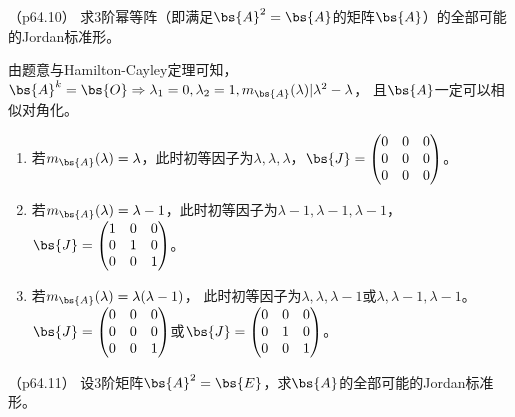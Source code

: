 \documentclass[12pt, a4paper, oneside, UTF8]{ctexbook}
\begin{document}
\begin{question}（p64.10）
    求$3$阶幂等阵（即满足$\bs{A}^2=\bs{A}$的矩阵$\bs{A}$）的全部可能的Jordan标准形。
\end{question}

\begin{solution}
    由题意与Hamilton-Cayley定理可知，$\bs{A}^k=\bs{O} \Rightarrow \lambda_1=0,\lambda_2=1,m_{\bs{A}}(\lambda)|\lambda^2-\lambda$，
    且$\bs{A}$一定可以相似对角化。
    \begin{enumerate}[label=(\arabic*)]
        \item 若$m_{\bs{A}}(\lambda)=\lambda$，此时初等因子为$\lambda,\lambda,\lambda$，$\bs{J}=\begin{pmatrix}
            0 &0 &0\\
            0 &0 &0\\
            0 &0 &0
        \end{pmatrix}$。
        \item 若$m_{\bs{A}}(\lambda)=\lambda-1$，此时初等因子为$\lambda-1,\lambda-1,\lambda-1$，$\bs{J}=\begin{pmatrix}
            1 &0 &0\\
            0 &1 &0\\
            0 &0 &1
        \end{pmatrix}$。
        \item 若$m_{\bs{A}}(\lambda)=\lambda(\lambda-1)$，
        此时初等因子为$\lambda,\lambda,\lambda-1$或$\lambda,\lambda-1,\lambda-1$。$\bs{J}=\begin{pmatrix}
        0 &0 &0\\
        0 &0 &0\\
        0 &0 &1
    \end{pmatrix}$或$\bs{J}=\begin{pmatrix}
        0 &0 &0\\
        0 &1 &0\\
        0 &0 &1
    \end{pmatrix}$。
    \end{enumerate}
\end{solution}


\begin{question}（p64.11）
    设$3$阶矩阵$\bs{A}^2=\bs{E}$，求$\bs{A}$的全部可能的Jordan标准形。
\end{question}
\end{document}

